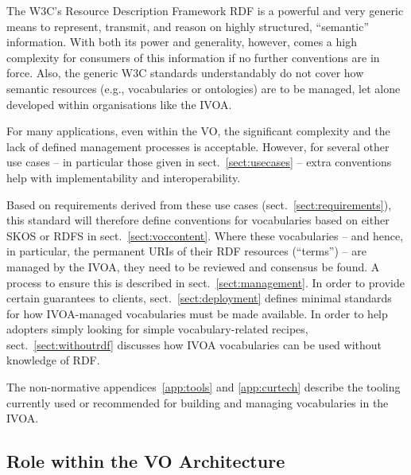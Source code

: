 \documentclass[11pt,a4paper]{ivoa}
\begin{document}
The W3C's Resource Description Framework RDF \citep{note:rdfprimer} is a powerful
and very generic means to represent, transmit, and reason on highly
structured, ``semantic'' information.  With both its power and
generality, however, comes a high complexity for consumers of this
information if no further conventions are in force.  Also, the generic
W3C standards understandably do not cover how semantic resources (e.g.,
vocabularies or ontologies) are to be managed, let alone developed
within organisations like the IVOA.

For many applications, even within the VO, the significant
complexity and the lack of defined management processes is acceptable.
However, for several other use cases -- in particular those given in
sect.~\ref{sect:usecases} -- extra conventions 
help with implementability and interoperability.

Based on requirements derived from these use cases 
(sect.~\ref{sect:requirements}), this standard will therefore define
conventions for vocabularies based on either SKOS \citep{std:skos} or
RDFS \citep{std:rdfs} in
sect.~\ref{sect:voccontent}.  Where these vocabularies -- and hence, in
particular, the permanent URIs of their RDF resources (``terms'') 
-- are managed by the
IVOA, they need to be reviewed and consensus be found.  A process to
ensure this is described in
sect.~\ref{sect:management}.  In order
to provide certain guarantees to clients, sect.~\ref{sect:deployment}
defines minimal standards for how IVOA-managed vocabularies must be made
available.  In order to help adopters simply looking for simple
vocabulary-related recipes, sect.~\ref{sect:withoutrdf} discusses how IVOA
vocabularies can be used without knowledge of RDF.

The non-normative appendices~\ref{app:tools} and \ref{app:curtech} 
describe the tooling
currently used or recommended for building and managing vocabularies in the
IVOA.


\subsection{Role within the VO Architecture}
\end{document}
